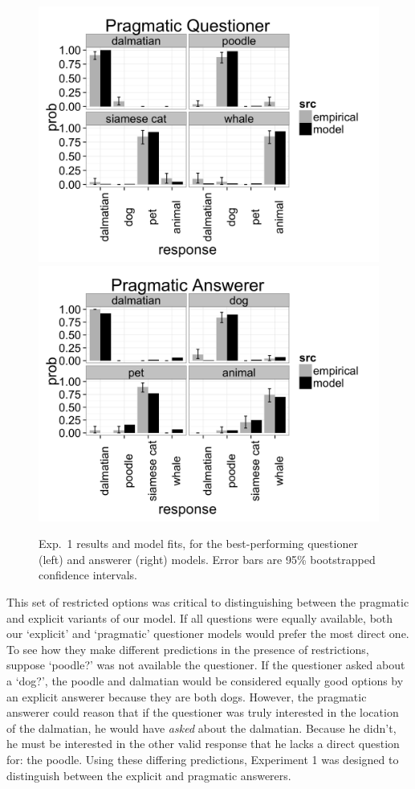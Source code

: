 \documentclass[12pt, floatsintext, jou]{apa6}
\begin{document}
\begin{figure}[t!]
\begin{center}
\includegraphics[scale = .11]{exp3QuestResultsPragmatic.png}
\includegraphics[scale = .11]{exp3AnsResultsPragmatic.png}
\end{center}
\caption{Exp.~1 results and model fits, for the best-performing questioner (left) and answerer (right) models. Error bars are 95\% bootstrapped confidence intervals.}
\label{fig:exp3res}
\end{figure}
This set of restricted options was critical to distinguishing between the pragmatic and explicit variants of our model. If all questions were equally available, both our `explicit' and `pragmatic' questioner models would prefer the most direct one. To see how they make different predictions in the presence of restrictions, suppose `poodle?' was not available the questioner. If the questioner asked about a `dog?', the poodle and dalmatian would be considered equally good options by an explicit answerer because they are both dogs. However, the pragmatic answerer could reason that if the questioner was truly interested in the location of the dalmatian, he would have \emph{asked} about the dalmatian. Because he didn't, he must be interested in the other valid response that he lacks a direct question for: the poodle. Using these differing predictions, Experiment 1 was designed to distinguish between the explicit and pragmatic answerers.
\end{document}
